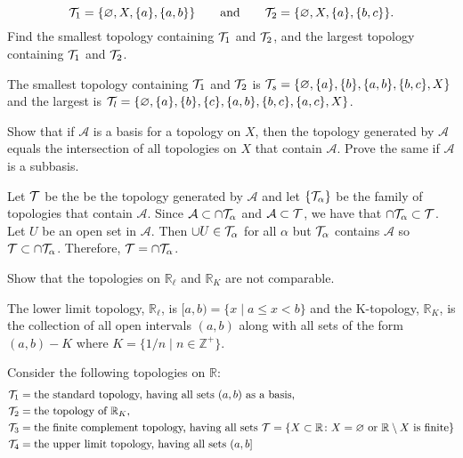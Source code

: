 \begin{exercise}
\begin{exercise}[label = (\alph*)]
\[    \mathcal{T}_1 = \{\varnothing, X, \{a\}, \{a, b\}\}\qquad\text{and}\qquad
    \mathcal{T}_2 = \{\varnothing, X, \{a\}, \{b, c\}\}.
    \]
    Find the smallest topology containing \(\mathcal{T}_1\) and \(\mathcal{T}_2\), and the
    largest topology containing \(\mathcal{T}_1\) and \(\mathcal{T}_2\).
    \par\smallskip
    The smallest topology containing \(\mathcal{T}_1\) and \(\mathcal{T}_2\) is
    \(\mathcal{T}_s = \{\varnothing,\{a\},\{b\},\{a,b\},\{b,c\},X\}\) and the largest
    is
    \(\mathcal{T}_l = \{\varnothing,\{a\},\{b\},\{c\},\{a,b\},\{b,c\},\{a,c\},X\}\).
  \end{exercise}
\item
  Show that if \(\mathcal{A}\) is a basis for a topology on \(X\), then the
  topology generated by \(\mathcal{A}\) equals the intersection of all
  topologies on \(X\) that contain \(\mathcal{A}\).
  Prove the same if \(\mathcal{A}\) is a subbasis.
  \par\smallskip
  Let \(\mathcal{T}\) be the be the topology generated by \(\mathcal{A}\) and let
  \(\{\mathcal{T}_{\alpha}\}\) be the family of topologies that contain
  \(\mathcal{A}\).
  Since \(\mathcal{A}\subset\cap\mathcal{T}_{\alpha}\) and
  \(\mathcal{A}\subset\mathcal{T}\), we have that \(\cap\mathcal{T}_{\alpha}\subset\mathcal{T}\).
  Let \(U\) be an open set in \(\mathcal{A}\).
  Then \(\cup U\in\mathcal{T}_{\alpha}\) for all \(\alpha\) but \(\mathcal{T}_{\alpha}\)
  contains \(\mathcal{A}\) so \(\mathcal{T}\subset\cap\mathcal{T}_{\alpha}\).
  Therefore, \(\mathcal{T} = \cap\mathcal{T}_{\alpha}\).
\item
  Show that the topologies on \(\mathbb{R}_{\ell}\) and \(\mathbb{R}_K\) are
  not comparable.
  \par\smallskip
  The lower limit topology, \(\mathbb{R}_{\ell}\), is
  \([a,b) = \{x\mid a\leq x < b\}\) and the K-topology, \(\mathbb{R}_K\),
  is the collection of all open intervals \((a,b)\) along with all sets of the
  form \((a,b) - K\) where \(K = \{1/n\mid n\in\mathbb{Z}^+\}\).
\item
  Consider the following topologies on \(\mathbb{R}\):
  \begin{align*}
    \Tau_1 & = \text{the standard topology, having all sets } (a, b)
             \text{ as a basis,}\\
    \Tau_2 & = \text{the topology of } \mathbb{R}_K,\\
    \Tau_3 & = \text{the finite complement topology, having all sets }
             \Tau = \{X\subset\mathbb{R}\colon X = \varnothing\text{ or }
             \mathbb{R}\setminus X\text{ is finite}\}\\
    \Tau_4 & = \text{the upper limit topology, having all sets } (a, b]

\end{align*}
\end{exercise}

